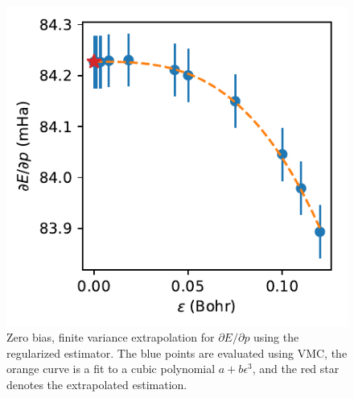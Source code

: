 \documentclass{article}
\begin{document}
\begin{figure}
\centering
\includegraphics{../plots/dedp.pdf}
\caption{Zero bias, finite variance extrapolation for $\partial E/\partial p$ using the regularized estimator. The blue points are evaluated using VMC, the orange curve is a fit to a cubic polynomial $a + b\epsilon^3$, and the red star denotes the extrapolated estimation. }
\end{figure}
\end{document}
